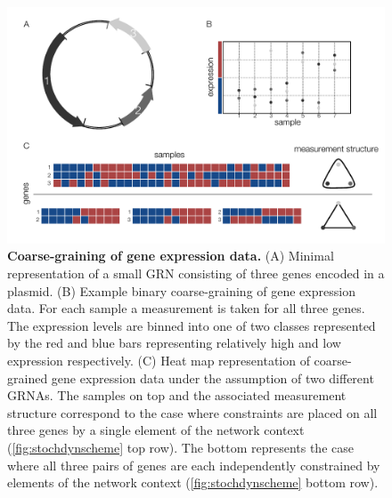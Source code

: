 \begin{figure}[!ht]
\centering
\noindent\includegraphics[width=0.9\columnwidth]{fig/figure_expression_concept.pdf}
\caption{{\bf Coarse-graining of gene expression data.} (A) Minimal representation of a small GRN consisting of three genes encoded in a plasmid. (B) Example binary coarse-graining of gene expression data. For each sample a measurement is taken for all three genes. The expression levels are binned into one of two classes represented by the red and blue bars representing relatively high and low expression respectively. (C) Heat map representation of coarse-grained gene expression data under the assumption of two different GRNAs. The samples on top and the associated measurement structure correspond to the case where constraints are placed on all three genes by a single element of the network context (\ref{fig:stochdynscheme} top row). The bottom represents the case where all three pairs of genes are each independently constrained by elements of the network context (\ref{fig:stochdynscheme} bottom row).}
\label{fig:expression_concept}
\end{figure}

